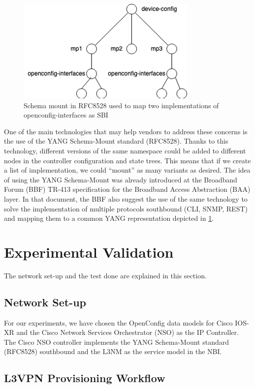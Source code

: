 \documentclass[conference]{IEEEtran}
\begin{document}
\begin{figure}
	\centering
		\includegraphics[scale=0.8]{figure3.png}
	\caption{Schema mount in RFC8528 used to map two implementations of openconfig-interfaces as SBI}
	\label{FIG:3}
\end{figure}

One of the main technologies that may help vendors to address these concerns is the use of the YANG Schema-Mount standard (RFC8528). Thanks to this technology, different versions of the same namespace could be added to different nodes in the controller configuration and state trees. This means that if we create a list of implementation, we could “mount” as many variants as desired. The idea of using the YANG Schema-Mount was already introduced at the Broadband Forum (BBF) TR-413 specification for the Broadband Access Abstraction (BAA) layer. In that document, the BBF also suggest the use of the same technology to solve the implementation of multiple protocols southbound (CLI, SNMP, REST) and mapping them to a common YANG representation depicted in \ref{FIG:3}.
\section{Experimental Validation}
The network set-up and the test done are explained in this section.

\subsection{Network Set-up}
For our experiments, we have chosen the OpenConfig data models for Cisco IOS-XR and the Cisco Network Services Orchestrator (NSO) as the IP Controller. The Cisco NSO controller implements the YANG Schema-Mount standard (RFC8528) southbound and the L3NM as the service model in the NBI.

\subsection{L3VPN Provisioning Workflow}
\end{document}
